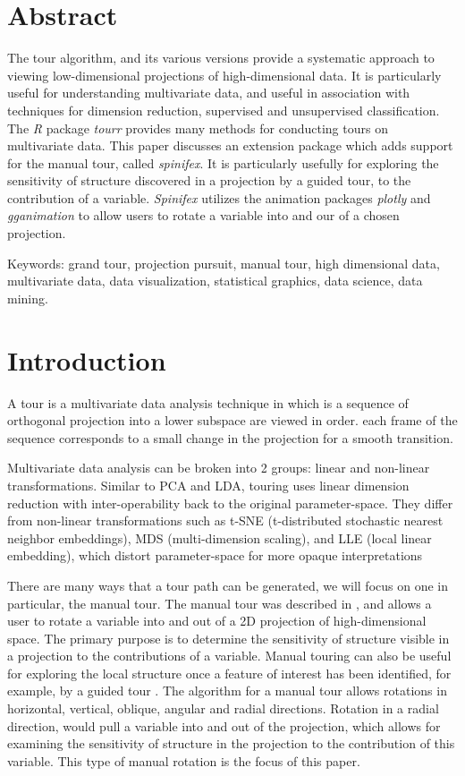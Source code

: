 \documentclass{monashthesis}
\begin{document}
\section{Abstract}\label{abstract-1}

The tour algorithm, and its various versions provide a systematic
approach to viewing low-dimensional projections of high-dimensional
data. It is particularly useful for understanding multivariate data, and
useful in association with techniques for dimension reduction,
supervised and unsupervised classification. The \emph{R} package
\emph{tourr} provides many methods for conducting tours on multivariate
data. This paper discusses an extension package which adds support for
the manual tour, called \emph{spinifex}. It is particularly usefully for
exploring the sensitivity of structure discovered in a projection by a
guided tour, to the contribution of a variable. \emph{Spinifex} utilizes
the animation packages \emph{plotly} and \emph{gganimation} to allow
users to rotate a variable into and our of a chosen projection.

Keywords: grand tour, projection pursuit, manual tour, high dimensional
data, multivariate data, data visualization, statistical graphics, data
science, data mining.

\section{Introduction}\label{introduction}

A tour is a multivariate data analysis technique in which is a sequence
of orthogonal projection into a lower subspace are viewed in order. each
frame of the sequence corresponds to a small change in the projection
for a smooth transition.

Multivariate data analysis can be broken into 2 groups: linear and
non-linear transformations. Similar to PCA and LDA, touring uses linear
dimension reduction with inter-operability back to the original
parameter-space. They differ from non-linear transformations such as
t-SNE (t-distributed stochastic nearest neighbor embeddings), MDS
(multi-dimension scaling), and LLE (local linear embedding), which
distort parameter-space for more opaque interpretations

There are many ways that a tour path can be generated, we will focus on
one in particular, the manual tour. The manual tour was described in
\textcite{cook_manual_1997}, and allows a user to rotate a variable into
and out of a 2D projection of high-dimensional space. The primary
purpose is to determine the sensitivity of structure visible in a
projection to the contributions of a variable. Manual touring can also
be useful for exploring the local structure once a feature of interest
has been identified, for example, by a guided tour
\autocite{cook_grand_1995}. The algorithm for a manual tour allows
rotations in horizontal, vertical, oblique, angular and radial
directions. Rotation in a radial direction, would pull a variable into
and out of the projection, which allows for examining the sensitivity of
structure in the projection to the contribution of this variable. This
type of manual rotation is the focus of this paper.
\end{document}
